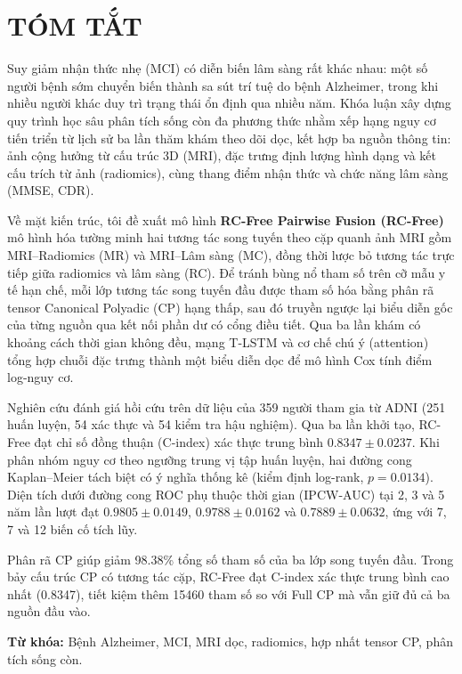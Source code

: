 \chapter*{TÓM TẮT}

Suy giảm nhận thức nhẹ (MCI) có diễn biến lâm sàng rất khác nhau: một số người bệnh sớm chuyển biến thành sa sút trí tuệ do bệnh Alzheimer, trong khi nhiều người khác duy trì trạng thái ổn định qua nhiều năm. Khóa luận xây dựng quy trình học sâu phân tích sống còn đa phương thức nhằm xếp hạng nguy cơ tiến triển từ lịch sử ba lần thăm khám theo dõi dọc, kết hợp ba nguồn thông tin: ảnh cộng hưởng từ cấu trúc 3D (MRI), đặc trưng định lượng hình dạng và kết cấu trích từ ảnh (radiomics), cùng thang điểm nhận thức và chức năng lâm sàng (MMSE, CDR).

Về mặt kiến trúc, tôi đề xuất mô hình \textbf{RC-Free Pairwise Fusion (RC-Free)} mô hình hóa tường minh hai tương tác song tuyến theo cặp quanh ảnh MRI gồm MRI--Radiomics (MR) và MRI--Lâm sàng (MC), đồng thời lược bỏ tương tác trực tiếp giữa radiomics và lâm sàng (RC). Để tránh bùng nổ tham số trên cỡ mẫu y tế hạn chế, mỗi lớp tương tác song tuyến đầu được tham số hóa bằng phân rã tensor Canonical Polyadic (CP) hạng thấp, sau đó truyền ngược lại biểu diễn gốc của từng nguồn qua kết nối phần dư có cổng điều tiết. Qua ba lần khám có khoảng cách thời gian không đều, mạng T-LSTM và cơ chế chú ý (attention) tổng hợp chuỗi đặc trưng thành một biểu diễn dọc để mô hình Cox tính điểm log-nguy cơ.

Nghiên cứu đánh giá hồi cứu trên dữ liệu của 359 người tham gia từ ADNI (251 huấn luyện, 54 xác thực và 54 kiểm tra hậu nghiệm). Qua ba lần khởi tạo, RC-Free đạt chỉ số đồng thuận (C-index) xác thực trung bình $0.8347\pm0.0237$. Khi phân nhóm nguy cơ theo ngưỡng trung vị tập huấn luyện, hai đường cong Kaplan--Meier tách biệt có ý nghĩa thống kê (kiểm định log-rank, $p=0.0134$). Diện tích dưới đường cong ROC phụ thuộc thời gian (IPCW-AUC) tại 2, 3 và 5 năm lần lượt đạt $0.9805\pm0.0149$, $0.9788\pm0.0162$ và $0.7889\pm0.0632$, ứng với 7, 7 và 12 biến cố tích lũy.

Phân rã CP giúp giảm 98.38\% tổng số tham số của ba lớp song tuyến đầu. Trong bảy cấu trúc CP có tương tác cặp, RC-Free đạt C-index xác thực trung bình cao nhất (0.8347), tiết kiệm thêm 15460 tham số so với Full CP mà vẫn giữ đủ cả ba nguồn đầu vào.

\noindent\textbf{Từ khóa:} Bệnh Alzheimer, MCI, MRI dọc, radiomics, hợp nhất tensor CP, phân tích sống còn.
